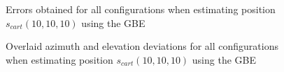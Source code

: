 \begin{figure}[!htbp]
	\captionsetup{justification=centering,margin=2cm}
	\caption{Errors obtained for all configurations when estimating position $s_{cart}(10,10,10)$ using the GBE}
	\label{fig:errors-101010}
\end{figure}

\begin{figure}[!htbp]
	\captionsetup{justification=centering,margin=2cm}
	\caption{Overlaid azimuth and elevation deviations for all configurations when estimating position $s_{cart}(10,10,10)$ using the GBE}
	\label{fig:both-101010}
\end{figure}

